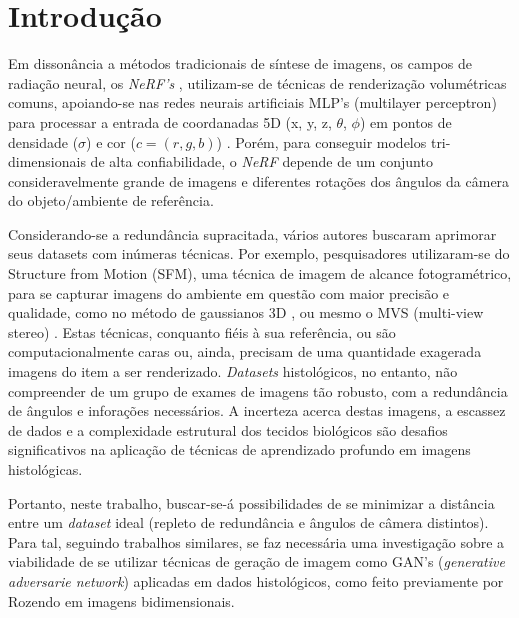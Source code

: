 \section{Introdução}
\label{sec:introducao}

Em dissonância a métodos tradicionais de síntese de imagens, os campos de radiação neural, os \textit{NeRF's} \cite{mildenhall2020nerfrepresentingscenesneural}, utilizam-se de técnicas de renderização volumétricas comuns, apoiando-se nas redes neurais artificiais MLP's (multilayer perceptron) \cite{GARDNER19982627} para processar a entrada de coordanadas 5D (x, y, z, $\theta$, $\phi$) em pontos de densidade ($\sigma$) e cor ($c = (r, g, b)$) \cite{mildenhall2020nerfrepresentingscenesneural}. Porém, para conseguir modelos tri-dimensionais de alta confiabilidade, o \textit{NeRF} depende de um conjunto consideravelmente grande de imagens e diferentes rotações dos ângulos da câmera do objeto/ambiente de referência.

Considerando-se a redundância supracitada, vários autores buscaram aprimorar seus datasets com inúmeras técnicas. Por exemplo, pesquisadores utilizaram-se do Structure from Motion (SFM), uma técnica de imagem de alcance fotogramétrico, para se capturar imagens do ambiente em questão com maior precisão e qualidade, como no método de gaussianos 3D \cite{kerbl3Dgaussians}, ou mesmo o MVS (multi-view stereo) \cite{garbin2021fastnerfhighfidelityneuralrendering}. Estas técnicas, conquanto fiéis à sua referência, ou são computacionalmente caras ou, ainda, precisam de uma quantidade exagerada imagens do item a ser renderizado. \textit{Datasets} histológicos, no entanto, não compreender de um grupo de exames de imagens tão robusto, com a redundância de ângulos e inforações necessários. A incerteza acerca destas imagens, a escassez de dados e a complexidade estrutural dos tecidos biológicos são desafios significativos na aplicação de técnicas de aprendizado profundo em imagens histológicas.  

Portanto, neste trabalho, buscar-se-á possibilidades de se minimizar a distância entre um \textit{dataset} ideal (repleto de redundância e ângulos de câmera distintos). Para tal, seguindo trabalhos similares, se faz necessária uma investigação sobre a viabilidade de se utilizar técnicas de geração de imagem como GAN's (\textit{generative adversarie network}) \cite{goodfellow2014generativeadversarialnetworks} aplicadas em dados histológicos, como feito previamente por Rozendo \cite{rozendo2024histdataaug} em imagens bidimensionais.


\newpage

